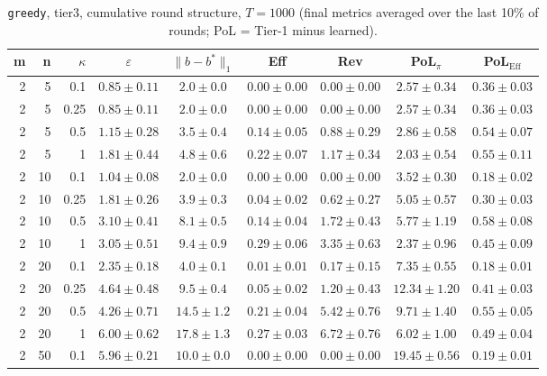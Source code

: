 \begin{table}[htbp]
\centering
\scriptsize
\caption{\texttt{greedy}, tier3, cumulative round structure, $T=1000$ (final metrics averaged over the last 10\% of rounds; PoL = Tier-1 minus learned).}
\label{tab:tier3_greedy_cumulative}
\begin{tabular}{@{}rrrcccccc@{}}
\toprule
m & n & $\kappa$ & $\varepsilon$ & $\|b-b^*\|_1$ & Eff & Rev & PoL$_\pi$ & PoL$_\mathrm{Eff}$ \\
\midrule
2 & 5 & 0.1 & $0.85 \pm 0.11$ & $2.0 \pm 0.0$ & $0.00 \pm 0.00$ & $0.00 \pm 0.00$ & $2.57 \pm 0.34$ & $0.36 \pm 0.03$ \\
2 & 5 & 0.25 & $0.85 \pm 0.11$ & $2.0 \pm 0.0$ & $0.00 \pm 0.00$ & $0.00 \pm 0.00$ & $2.57 \pm 0.34$ & $0.36 \pm 0.03$ \\
2 & 5 & 0.5 & $1.15 \pm 0.28$ & $3.5 \pm 0.4$ & $0.14 \pm 0.05$ & $0.88 \pm 0.29$ & $2.86 \pm 0.58$ & $0.54 \pm 0.07$ \\
2 & 5 & 1 & $1.81 \pm 0.44$ & $4.8 \pm 0.6$ & $0.22 \pm 0.07$ & $1.17 \pm 0.34$ & $2.03 \pm 0.54$ & $0.55 \pm 0.11$ \\
2 & 10 & 0.1 & $1.04 \pm 0.08$ & $2.0 \pm 0.0$ & $0.00 \pm 0.00$ & $0.00 \pm 0.00$ & $3.52 \pm 0.30$ & $0.18 \pm 0.02$ \\
2 & 10 & 0.25 & $1.81 \pm 0.26$ & $3.9 \pm 0.3$ & $0.04 \pm 0.02$ & $0.62 \pm 0.27$ & $5.05 \pm 0.57$ & $0.30 \pm 0.03$ \\
2 & 10 & 0.5 & $3.10 \pm 0.41$ & $8.1 \pm 0.5$ & $0.14 \pm 0.04$ & $1.72 \pm 0.43$ & $5.77 \pm 1.19$ & $0.58 \pm 0.08$ \\
2 & 10 & 1 & $3.05 \pm 0.51$ & $9.4 \pm 0.9$ & $0.29 \pm 0.06$ & $3.35 \pm 0.63$ & $2.37 \pm 0.96$ & $0.45 \pm 0.09$ \\
2 & 20 & 0.1 & $2.35 \pm 0.18$ & $4.0 \pm 0.1$ & $0.01 \pm 0.01$ & $0.17 \pm 0.15$ & $7.35 \pm 0.55$ & $0.18 \pm 0.01$ \\
2 & 20 & 0.25 & $4.64 \pm 0.48$ & $9.5 \pm 0.4$ & $0.05 \pm 0.02$ & $1.20 \pm 0.43$ & $12.34 \pm 1.20$ & $0.41 \pm 0.03$ \\
2 & 20 & 0.5 & $4.26 \pm 0.71$ & $14.5 \pm 1.2$ & $0.21 \pm 0.04$ & $5.42 \pm 0.76$ & $9.71 \pm 1.40$ & $0.55 \pm 0.05$ \\
2 & 20 & 1 & $6.00 \pm 0.62$ & $17.8 \pm 1.3$ & $0.27 \pm 0.03$ & $6.72 \pm 0.76$ & $6.02 \pm 1.00$ & $0.49 \pm 0.04$ \\
2 & 50 & 0.1 & $5.96 \pm 0.21$ & $10.0 \pm 0.0$ & $0.00 \pm 0.00$ & $0.00 \pm 0.00$ & $19.45 \pm 0.56$ & $0.19 \pm 0.01$ \\

\end{tabular}
\end{table}
